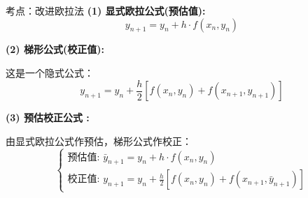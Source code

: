 \documentclass[12pt, a4paper]{article}
\begin{document}
\begin{knowpoint}{考点：改进欧拉法}
    \noindent \textbf{(1) 显式欧拉公式(预估值):}
    \[
    y_{n+1} = y_n + h \cdot f(x_n, y_n)
    \]

    \noindent \textbf{(2) 梯形公式(校正值):}

    这是一个隐式公式：
    \[
    y_{n+1} = y_n + \frac{h}{2} \left[ f(x_n, y_n) + f(x_{n+1}, y_{n+1}) \right]
    \]

    \noindent \textbf{(3) 预估校正公式 :}

    由显式欧拉公式作预估，梯形公式作校正：
    \[
    \begin{cases}
    \text{预估值: } \bar{y}_{n+1} = y_n + h \cdot f(x_n, y_n) \\
    \text{校正值: } y_{n+1} = y_n + \frac{h}{2} \left[ f(x_n, y_n) + f(x_{n+1}, \bar{y}_{n+1}) \right]
    \end{cases}
    \]
\end{knowpoint}
\end{document}
